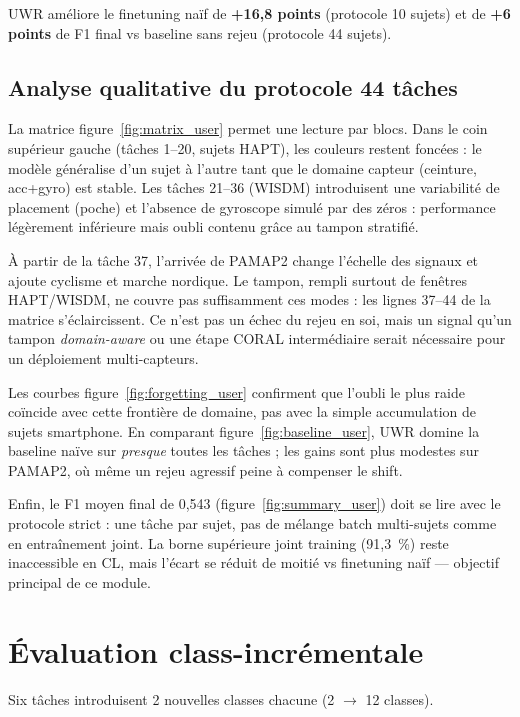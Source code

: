 \documentclass[a4paper,12pt]{report}
\begin{document}
UWR améliore le finetuning naïf de \textbf{+16,8 points} (protocole 10 sujets) et
de \textbf{+6 points} de F1 final vs baseline sans rejeu (protocole 44 sujets).

\subsection{Analyse qualitative du protocole 44 tâches}

La matrice figure~\ref{fig:matrix_user} permet une lecture par blocs. Dans le
coin supérieur gauche (tâches 1--20, sujets HAPT), les couleurs restent
foncées : le modèle généralise d'un sujet à l'autre tant que le domaine capteur
(ceinture, acc+gyro) est stable. Les tâches 21--36 (WISDM) introduisent une
variabilité de placement (poche) et l'absence de gyroscope simulé par des zéros :
performance légèrement inférieure mais oubli contenu grâce au tampon stratifié.

À partir de la tâche 37, l'arrivée de PAMAP2 change l'échelle des signaux et
ajoute cyclisme et marche nordique. Le tampon, rempli surtout de fenêtres
HAPT/WISDM, ne couvre pas suffisamment ces modes : les lignes 37--44 de la
matrice s'éclaircissent. Ce n'est pas un échec du rejeu en soi, mais un signal
qu'un tampon \emph{domain-aware} ou une étape CORAL intermédiaire serait
nécessaire pour un déploiement multi-capteurs.

Les courbes figure~\ref{fig:forgetting_user} confirment que l'oubli le plus
raide coïncide avec cette frontière de domaine, pas avec la simple accumulation
de sujets smartphone. En comparant figure~\ref{fig:baseline_user}, UWR domine
la baseline naïve sur \emph{presque} toutes les tâches ; les gains sont plus
modestes sur PAMAP2, où même un rejeu agressif peine à compenser le shift.

Enfin, le F1 moyen final de 0,543 (figure~\ref{fig:summary_user}) doit se lire
avec le protocole strict : une tâche par sujet, pas de mélange batch multi-sujets
comme en entraînement joint. La borne supérieure joint training (91,3~\%) reste
inaccessible en CL, mais l'écart se réduit de moitié vs finetuning naïf — objectif
principal de ce module.

\section{Évaluation class-incrémentale}

Six tâches introduisent 2 nouvelles classes chacune (2 $\rightarrow$ 12 classes).
\end{document}
